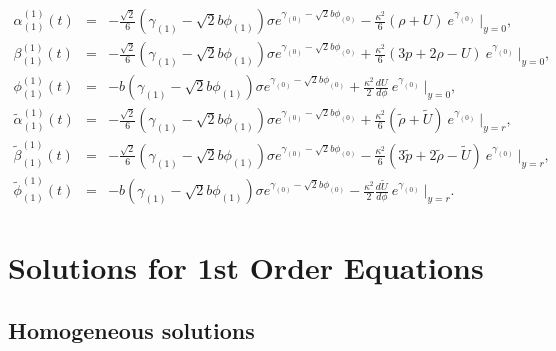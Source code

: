 \documentclass[a4paper,11pt]{article}
\begin{document}
\begin{eqnarray}
\alpha_{(1)}^{(1)}(t) &=& -\frac{\sqrt{2}}{6}
\left(
\gamma_{(1)}-\sqrt{2}b\phi_{(1)}
\right)\sigma
e^{
\gamma_{(0)}-\sqrt{2}b\phi_{(0)} } 
-\frac{\kappa^2}{6} (\rho+U) \ e^{ \gamma_{(0)} } \ \big|_{y=0},
\label{eq:junc_0_a} \\
\beta_{(1)}^{(1)}(t) &=& -\frac{\sqrt{2}}{6}
\left(
\gamma_{(1)}-\sqrt{2}b\phi_{(1)}
\right)\sigma
e^{
\gamma_{(0)}-\sqrt{2}b\phi_{(0)}
}
+\frac{\kappa^2}{6}(3 p+2 \rho -U) \ e^{
\gamma_{(0)}
} \ \big|_{y=0}, \\
\phi_{(1)}^{(1)}(t) &=& 
-b\left(
\gamma_{(1)}-\sqrt{2}b\phi_{(1)}
\right)\sigma
e^{
\gamma_{(0)}-\sqrt{2}b\phi_{(0)}
}
+\frac{\kappa^2}{2} \frac{d U}{d \phi} \ e^{\gamma_{(0)}
}\ \big|_{y=0}, \\
\tilde{\alpha}_{(1)}^{(1)}(t) &=& -\frac{\sqrt{2}}{6}
\left(
\gamma_{(1)}-\sqrt{2}b\phi_{(1)}
\right)\sigma
e^{
\gamma_{(0)}-\sqrt{2}b\phi_{(0)}
}
+\frac{\kappa^2}{6}(\tilde{\rho}+\tilde{U}) \ e^{
\gamma_{(0)}
}\ \big|_{y=r},
\label{eq:junc_r_a} \\
\tilde{\beta}_{(1)}^{(1)}(t) &=& -\frac{\sqrt{2}}{6}
\left(
\gamma_{(1)}-\sqrt{2}b\phi_{(1)}
\right)\sigma
e^{
\gamma_{(0)}-\sqrt{2}b\phi_{(0)}
}
-\frac{\kappa^2}{6}(3 \tilde{p}+2 \tilde{\rho} - \tilde{U}) \ e^{
\gamma_{(0)}
}\ \big|_{y=r}, \\
\tilde{\phi}_{(1)}^{(1)}(t) &=& 
-b\left(
\gamma_{(1)}-\sqrt{2}b\phi_{(1)}
\right)\sigma
e^{
\gamma_{(0)}-\sqrt{2}b\phi_{(0)}
}
-\frac{\kappa^2}{2} \frac{d \tilde{U}}{d \phi}\ e^{\gamma_{(0)}
}\ \big|_{y=r}. 
\end{eqnarray}

\newpage

\section{Solutions for 1st Order Equations \label{APP2} } 

\subsection{Homogeneous solutions}
\end{document}
